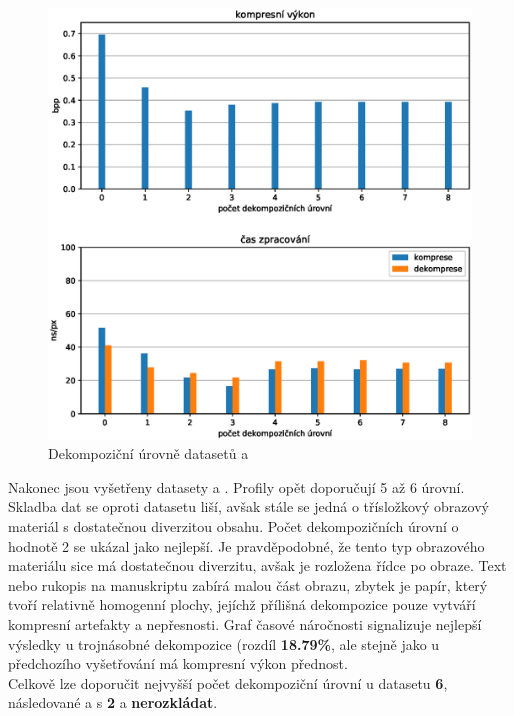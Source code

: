 \begin{figure}[hbt!]
  \centering
  \hspace*{-0.75cm}
  \includegraphics[width=16cm]{obrazky-figures/levels/mapy_levels.eps}
  \caption{Dekompoziční úrovně datasetů  a }
\end{figure}
\noindent Nakonec jsou vyšetřeny datasety  a . Profily opět doporučují 5 až 6 úrovní. Skladba dat se oproti datasetu  liší, avšak stále se jedná o třísložkový obrazový materiál s dostatečnou diverzitou obsahu. Počet dekompozičních úrovní o hodnotě 2 se ukázal jako nejlepší. Je pravděpodobné, že tento typ obrazového materiálu sice má dostatečnou diverzitu, avšak je rozložena řídce po obraze. Text nebo rukopis na manuskriptu zabírá malou část obrazu, zbytek je papír, který tvoří relativně homogenní plochy, jejíchž přílišná dekompozice pouze vytváří kompresní artefakty a nepřesnosti. Graf časové náročnosti signalizuje nejlepší výsledky u trojnásobné dekompozice (rozdíl \textbf{18.79\%}, ale stejně jako u předchozího vyšetřování má kompresní výkon přednost.\\
Celkově lze doporučit nejvyšší počet dekompoziční úrovní u datasetu  \textbf{6}, následované  a  s \textbf{2} a  \textbf{nerozkládat}.

